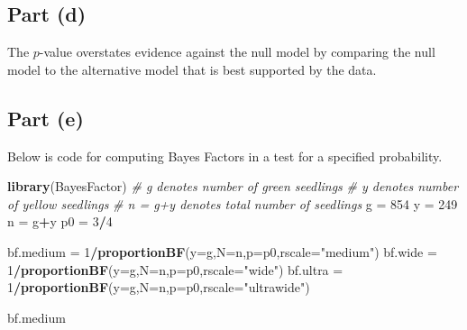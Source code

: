\documentclass[
]{article}
\newenvironment{Shaded}{\begin{snugshade}}{\end{snugshade}}
\newcommand{\AttributeTok}[1]{\textcolor[rgb]{0.13,0.29,0.53}{#1}}
\newcommand{\CommentTok}[1]{\textcolor[rgb]{0.56,0.35,0.01}{\textit{#1}}}
\newcommand{\DecValTok}[1]{\textcolor[rgb]{0.00,0.00,0.81}{#1}}
\newcommand{\FunctionTok}[1]{\textcolor[rgb]{0.13,0.29,0.53}{\textbf{#1}}}
\newcommand{\NormalTok}[1]{#1}
\newcommand{\OtherTok}[1]{\textcolor[rgb]{0.56,0.35,0.01}{#1}}
\newcommand{\SpecialCharTok}[1]{\textcolor[rgb]{0.81,0.36,0.00}{\textbf{#1}}}
\newcommand{\StringTok}[1]{\textcolor[rgb]{0.31,0.60,0.02}{#1}}
\begin{document}
\hypertarget{part-d}{%
\subsection{Part (d)}\label{part-d}}


The \(p\)-value overstates evidence against the null model by comparing
the null model to the alternative model that is best supported by the
data.

\hypertarget{part-e}{%
\subsection{Part (e)}\label{part-e}}


Below is code for computing Bayes Factors in a test for a specified
probability.

\begin{Shaded}
\begin{Highlighting}[]
\FunctionTok{library}\NormalTok{(BayesFactor)}
\CommentTok{\# g denotes number of green seedlings}
\CommentTok{\# y denotes number of yellow seedlings}
\CommentTok{\# n = g+y denotes total number of seedlings}
\NormalTok{g }\OtherTok{=} \DecValTok{854}
\NormalTok{y }\OtherTok{=} \DecValTok{249}
\NormalTok{n }\OtherTok{=}\NormalTok{ g}\SpecialCharTok{+}\NormalTok{y}
\NormalTok{p0 }\OtherTok{=} \DecValTok{3}\SpecialCharTok{/}\DecValTok{4}

\NormalTok{bf.medium }\OtherTok{=} \DecValTok{1}\SpecialCharTok{/}\FunctionTok{proportionBF}\NormalTok{(}\AttributeTok{y=}\NormalTok{g,}\AttributeTok{N=}\NormalTok{n,}\AttributeTok{p=}\NormalTok{p0,}\AttributeTok{rscale=}\StringTok{"medium"}\NormalTok{)}
\NormalTok{bf.wide }\OtherTok{=} \DecValTok{1}\SpecialCharTok{/}\FunctionTok{proportionBF}\NormalTok{(}\AttributeTok{y=}\NormalTok{g,}\AttributeTok{N=}\NormalTok{n,}\AttributeTok{p=}\NormalTok{p0,}\AttributeTok{rscale=}\StringTok{"wide"}\NormalTok{)}
\NormalTok{bf.ultra }\OtherTok{=} \DecValTok{1}\SpecialCharTok{/}\FunctionTok{proportionBF}\NormalTok{(}\AttributeTok{y=}\NormalTok{g,}\AttributeTok{N=}\NormalTok{n,}\AttributeTok{p=}\NormalTok{p0,}\AttributeTok{rscale=}\StringTok{"ultrawide"}\NormalTok{)}

\NormalTok{bf.medium}
\end{Highlighting}
\end{Shaded}
\end{document}
